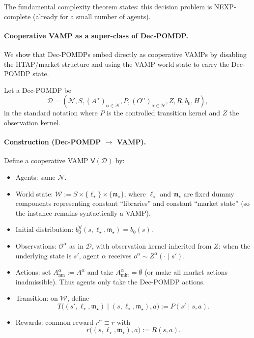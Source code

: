 The fundamental complexity theorem states: this decision problem is NEXP-complete (already for a small number of agents).

\paragraph{Cooperative VAMP as a super-class of Dec-POMDP.}
We show that Dec-POMDPs embed directly as cooperative VAMPs by disabling the HTAP/market structure and using the VAMP world state to carry the Dec-POMDP state.

Let a Dec-POMDP be
\[
\mathcal D = (\mathcal N, S, (A^\alpha)_{\alpha\in\mathcal N}, P, (O^\alpha)_{\alpha\in\mathcal N}, Z, R, b_0, H),
\]
in the standard notation where \(P\) is the controlled transition kernel and \(Z\) the observation kernel.

\paragraph{Construction (Dec-POMDP \(\to\) VAMP).}
Define a cooperative VAMP \(\mathsf V(\mathcal D)\) by:
\begin{itemize}
\item Agents: same \(\mathcal N\).
\item World state: \(\mathcal W := S \times \{\ell_\star\} \times \{\mathfrak m_\star\}\), where \(\ell_\star\) and \(\mathfrak m_\star\) are fixed dummy components representing constant ``libraries'' and constant ``market state'' (so the instance remains syntactically a VAMP).
\item Initial distribution: \(b_0^{\mathsf V}(s,\ell_\star,\mathfrak m_\star)=b_0(s)\).
\item Observations: \(\mathcal O^\alpha\) as in \(\mathcal D\), with observation kernel inherited from \(Z\): when the underlying state is \(s'\), agent \(\alpha\) receives \(o^\alpha \sim Z^\alpha(\cdot\mid s')\).
\item Actions: set \(A^\alpha_{\mathrm{nm}} := A^\alpha\) and take \(A^\alpha_{\mathrm{mkt}}=\emptyset\) (or make all market actions inadmissible). Thus agents only take the Dec-POMDP actions.
\item Transition: on \(\mathcal W\), define
\[
T\big((s',\ell_\star,\mathfrak m_\star)\mid (s,\ell_\star,\mathfrak m_\star), a\big) := P(s'\mid s,a).
\]
\item Rewards: common reward \(r^\alpha \equiv r\) with
\[
r\big((s,\ell_\star,\mathfrak m_\star), a\big) := R(s,a).
\]
\end{itemize}

